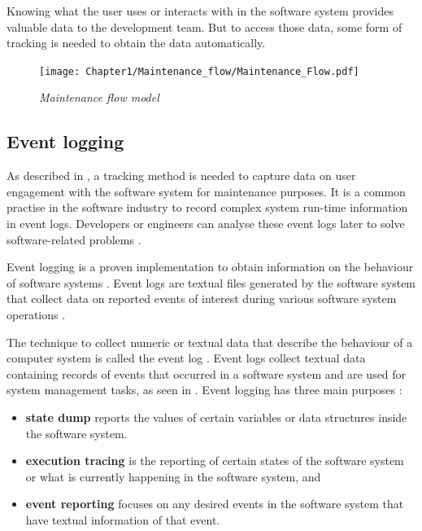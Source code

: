 \clearpage

Knowing what the user uses or interacts with in the software system provides valuable data to the development team. But to access those data, some form of tracking is needed to obtain the data automatically.

\begin{figure}[!htb]
	\centering %
	\texttt{[image: Chapter1/Maintenance\_flow/Maintenance\_Flow.pdf]}
	\caption[Maintenance flow model]
	{\textit{Maintenance flow model \cite{Tang2010}}} \label{fig:ch1_maintenanceFlow}
\end{figure}

\clearpage

\subsection{Event logging}\label{sec:ch1_eventLogging}
As described in , a tracking method is needed to capture data on user engagement with the software system for maintenance purposes. It is a common practise in the software industry to record complex system run-time information in event logs. Developers or engineers can analyse these event logs later to solve software-related problems \cite{Zhu2019}. \par Event logging is a proven implementation to obtain information on the behaviour of software systems \cite{Baccanico2014}. Event logs are textual files generated by the software system that collect data on reported events of interest during various software system operations \cite{Cinque2013, Baccanico2014}.\par The technique to collect numeric or textual data that describe the behaviour of a computer system is called the event log \cite{Pecchia2015, Baccanico2014}. Event logs collect textual data containing records of events that occurred in a software system and are used for system management tasks, as seen in  \cite{Rong2018a, Rong2018, Baccanico2014}. Event logging has three main purposes \cite{Pecchia2015, Baccanico2014}:

\begin{itemize}
	\item \textbf{state dump} reports the values of certain variables or data structures inside the software system.
	\item \textbf{execution tracing} is the reporting of certain states of the software system or what is currently happening in the software system, and
	\item \textbf{event reporting} focuses on any desired events in the software system that have textual information of that event.
\end{itemize}

